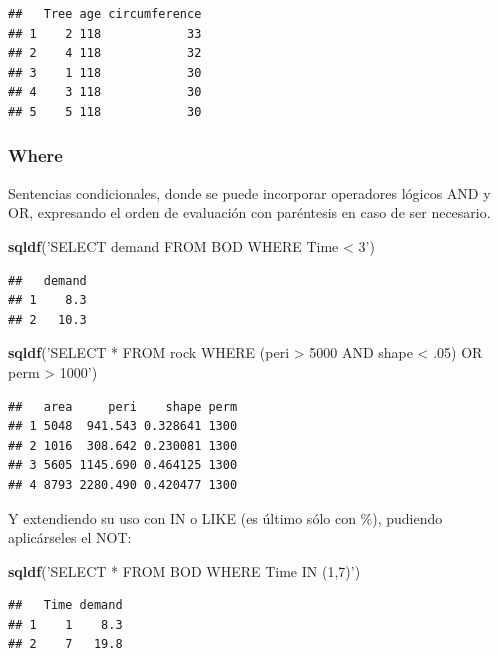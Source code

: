\documentclass[
]{book}
\newenvironment{Shaded}{\begin{snugshade}}{\end{snugshade}}
\newcommand{\KeywordTok}[1]{\textcolor[rgb]{0.13,0.29,0.53}{\textbf{#1}}}
\newcommand{\NormalTok}[1]{#1}
\newcommand{\StringTok}[1]{\textcolor[rgb]{0.31,0.60,0.02}{#1}}
\begin{document}
\begin{verbatim}
##   Tree age circumference
## 1    2 118            33
## 2    4 118            32
## 3    1 118            30
## 4    3 118            30
## 5    5 118            30
\end{verbatim}

\hypertarget{where}{%
\subsubsection{Where}\label{where}}

Sentencias condicionales, donde se puede incorporar operadores lógicos AND y OR, expresando el orden de evaluación con paréntesis en caso de ser necesario.

\begin{Shaded}
\begin{Highlighting}[]
\KeywordTok{sqldf}\NormalTok{(}\StringTok{'SELECT demand FROM BOD WHERE Time < 3'}\NormalTok{)}
\end{Highlighting}
\end{Shaded}

\begin{verbatim}
##   demand
## 1    8.3
## 2   10.3
\end{verbatim}

\begin{Shaded}
\begin{Highlighting}[]
\KeywordTok{sqldf}\NormalTok{(}\StringTok{'SELECT * FROM rock WHERE (peri > 5000 AND shape < .05) OR perm > 1000'}\NormalTok{)}
\end{Highlighting}
\end{Shaded}

\begin{verbatim}
##   area     peri    shape perm
## 1 5048  941.543 0.328641 1300
## 2 1016  308.642 0.230081 1300
## 3 5605 1145.690 0.464125 1300
## 4 8793 2280.490 0.420477 1300
\end{verbatim}

Y extendiendo su uso con IN o LIKE (es último sólo con \%), pudiendo aplicárseles el NOT:

\begin{Shaded}
\begin{Highlighting}[]
\KeywordTok{sqldf}\NormalTok{(}\StringTok{'SELECT * FROM BOD WHERE Time IN (1,7)'}\NormalTok{)}
\end{Highlighting}
\end{Shaded}

\begin{verbatim}
##   Time demand
## 1    1    8.3
## 2    7   19.8
\end{verbatim}
\end{document}
